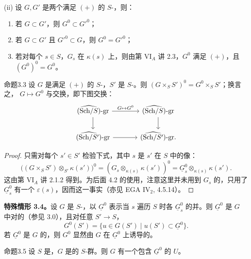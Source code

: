 (ii) 设 $G,G'$ 是两个满足 $(+)$ 的 $S$-，则：
\begin{enumerate}
\item[a)] 若 $G\subset G'$，则 $G^0\subset G'^0$；
\item[b)] 若 $G\subset G'$ 且 $G'^0\subset G$，则 $G^0=G'^0$；
\item[c)] 若对每个 $s\in S$，$G_s$ 在 $\kappa(s)$ 上，则由第 VI$_A$ 讲 2.3，$G^0$ 满足 $(+)$，且 $(G^0)^0=G^0$。
\end{enumerate}
\begin{SGAresult}{命题}{3.3}
设 $G$ 是满足 $(+)$ 的 $S$-，$S'$ 是 $S$-。则 $(G\times_SS')^0=G^0\times_SS'$；换言之， $G\mapsto G^0$
与交换，即下图交换：
\[
\begin{tikzcd}[column sep=large]
(\widehat{\mathrm{Sch}/S})\text{-}\mathrm{gr}\arrow[r,"{G\mapsto G^0}"]\arrow[d]
 &(\widehat{\mathrm{Sch}/S})\text{-}\mathrm{gr}\arrow[d]\\
(\widehat{\mathrm{Sch}/S'})\text{-}\mathrm{gr}\arrow[r]
 &(\widehat{\mathrm{Sch}/S'})\text{-}\mathrm{gr}.
\end{tikzcd}
\]
\end{SGAresult}
\begin{proof}
只需对每个 $s'\in S'$ 检验下式，其中 $s$ 是 $s'$ 在 $S$ 中的像：
\[
\bigl((G\times_SS')\otimes_{S'}\kappa(s')\bigr)^0
=(G_s\otimes_{\kappa(s)}\kappa(s'))^0
=\underline G_s^0\otimes_{\kappa(s)}\kappa(s').
\]
这由第 VI$_A$ 讲 2.1.2 得到。为后面 4.2 的使用，注意这里并未用到 $G_s$ 的，只用了 $\underline G_s^0$ 有一个 $\varepsilon(s)$，因而这一事实（亦见 EGA IV$_2$, 4.5.14）。
\end{proof}
\textbf{特殊情形 3.4。}设 $G$ 是 $S$-，以 $\underline G^0$ 表示当 $s$ 遍历 $S$ 时各 $\underline G_s^0$ 的并。则 $\underline G^0$ 是 $G$ 中对的（参见 3.0），且对任意 $S'\to S$，
\[
G^0(S')=\{u\in G(S')\mid u(S')\subset\underline G^0\}.
\]
若 $\underline G^0$ 是 $G$ 的，则 $G^0$ 显然由 $G$ 在 $\underline G^0$ 上诱导的。
\begin{SGAresult}{命题}{3.5}
设 $S$ 是，$G$ 是的 $S$-群。则 $G$ 有一个包含 $\underline G^0$ 的 $U$。
\end{SGAresult}
